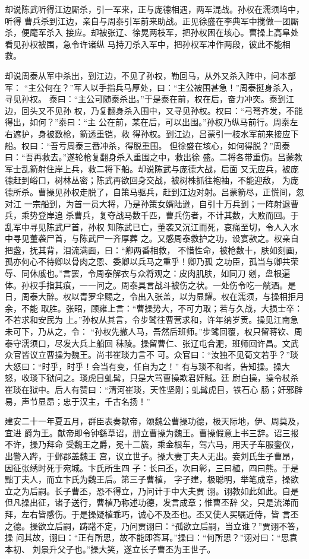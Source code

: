 却说陈武听得江边厮杀，引一军来，正与庞德相遇，两军混战。孙权在濡须坞中，听得
曹兵杀到江边，亲自与周泰引军前来助战。正见徐盛在李典军中搅做一团厮杀，便麾军杀入
接应。却被张辽、徐晃两枝军，把孙权困在垓心。曹操上高阜处看见孙权被围，急令许诸纵
马持刀杀入军中，把孙权军冲作两段，彼此不能相救。

却说周泰从军中杀出，到江边，不见了孙权，勒回马，从外又杀入阵中，问本部军：
“主公何在？”军人以手指兵马厚处，曰：“主公被围甚急！”周泰挺身杀入，寻见孙权。
泰曰：“主公可随泰杀出。”于是泰在前，权在后，奋力冲突。泰到江边，回头又不见孙
权，乃复翻身杀入围中，又寻见孙权。权曰：“弓弩齐发，不能得出，如何？”泰曰：“主
公在前，某在后，可以出围。”孙权乃纵马前行。周泰左右遮护，身被数枪，箭透重铠，救
得孙权。到江边，吕蒙引一枝水军前来接应下船。权曰：“吾亏周泰三番冲杀，得脱重围。
但徐盛在垓心，如何得脱？”周泰曰：“吾再救去。”遂轮枪复翻身杀入重围之中，救出徐
盛。二将各带重伤。吕蒙教军士乱箭射住岸上兵，救二将下船。却说陈武与庞德大战，后面
又无应兵，被庞德赶到峪口，树林丛密；陈武再欲回身交战，被树株抓往袍袖，不能迎敌，
为庞德所杀。曹操见孙权走脱了，自策马驱兵，赶到江边对射。吕蒙箭尽，正慌间，忽对江
一宗船到，为首一员大将，乃是孙策女婿陆逊，自引十万兵到；一阵射退曹兵，乘势登岸追
杀曹兵，复夺战马数千匹，曹兵伤者，不计其数，大败而回。于乱军中寻见陈武尸首，孙权
知陈武已亡，董袭又沉江而死，哀痛至切，令人入水中寻见董袭尸首，与陈武尸一齐厚葬
之。又感周泰救护之功，设宴款之。权亲自把盏，抚其背，泪流满面，曰：“卿两番相救，
不惜性命，被枪数十，肤如刻画，孤亦何心不待卿以骨肉之恩、委卿以兵马之重乎！卿乃孤
之功臣，孤当与卿共荣辱、同休戚也。”言罢，令周泰解衣与众将观之：皮肉肌肤，如同刀
剜，盘根遍体。孙权手指其痕，一一问之。周泰具言战斗被伤之状。一处伤令吃一觥酒。是
日，周泰大醉。权以青罗伞赐之，令出入张盖，以为显耀。权在濡须，与操相拒月余，不能
取胜。张昭，顾雍上言：“曹操势大，不可力取；若与久战，大损士卒：不若求和安民为
上。”孙权从其言，令步骘往曹营求和，许年纳岁贡。操见江南急未可下，乃从之，令：
“孙权先撤人马，吾然后班师。”步骘回覆，权只留蒋钦、周泰守濡须口，尽发大兵上船回
秣陵。操留曹仁、张辽屯合淝，班师回许昌。文武众官皆议立曹操为魏王。尚书崔琰力言不
可。众官曰：“汝独不见荀文若乎？”琰大怒曰：“时乎，时乎！会当有变，任自为之！”
有与琰不和者，告知操。操大怒，收琰下狱问之。琰虎目虬髯，只是大骂曹操欺君奸贼。廷
尉白操，操令杖杀崔琰在狱中。后人有赞曰：“清河崔琰，天性坚刚；虬髯虎目，铁石心
肠；奸邪辟易，声节显昂；忠于汉主，千古名扬！”

建安二十一年夏五月，群臣表奏献帝，颂魏公曹操功德，极天际地，伊、周莫及，宜进
爵为王。献帝即令钟繇草诏，册立曹操为魏王。曹操假意上书三辞。诏三报不许，操乃拜命
受魏王之爵，冕十二旒，乘金根车，驾六马，用天子车服銮仪，出警入跸，于邺郡盖魏王
宫，议立世子。操大妻丁夫人无出。妾刘氏生子曹昂，因征张绣时死于宛城。卞氏所生四
子：长曰丕，次曰彰，三曰植，四曰熊。于是黜丁夫人，而立卞氏为魏王后。第三子曹植，
字子建，极聪明，举笔成章，操欲立之为后嗣。长子曹丕，恐不得立，乃问计于中大夫贾
诩。诩教如此如此。自是但凡操出征，诸子送行，曹植乃称述功德，发言成章；惟曹丕辞
父，只是流涕而拜，左右皆感伤。于是操疑植乖巧，诚心不及丕也。丕又使人买嘱近侍，皆
言丕之德。操欲立后嗣，踌躇不定，乃问贾诩曰：“孤欲立后嗣，当立谁？”贾诩不答，操
问其故，诩曰：“正有所思，故不能即答耳。”操曰：“何所思？”诩对曰：“思袁本初、
刘景升父子也。”操大笑，遂立长子曹丕为王世子。

